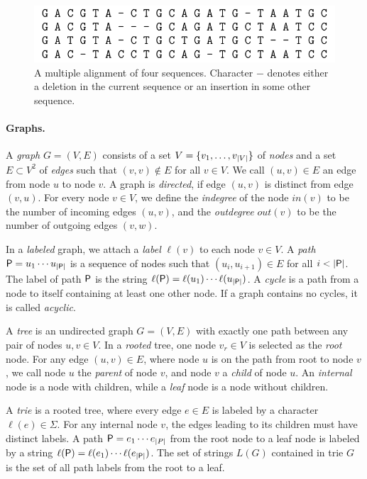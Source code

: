 \begin{figure}
\centerline{\includegraphics{figures/alignment.pdf}}
\caption{A multiple alignment of four sequences. Character $-$ denotes either a deletion in the current sequence or an insertion in some other sequence.}
\label{fig:multiple alignment}
\end{figure}


\paragraph{Graphs.}

A \emph{graph} $G = (V, E)$ consists of a set $V = \{ v_{1}, \dotsc, 
v_{\lvert V \rvert} \}$ of \emph{nodes} and a set $E \subset V^{2}$ of \emph{edges} such that 
$(v, v) \not\in E$ for all $v \in V$. We call $(u, v) \in E$ an edge from node $u$ 
to node $v$. A graph is \emph{directed}, if edge $(u, v)$ is distinct from edge 
$(v, u)$. For every node $v \in V$, 
we define the \emph{indegree} of the node $in(v)$ to be the number of incoming 
edges $(u, v)$, and the \emph{outdegree} $out(v)$ to be the number of outgoing 
edges $(v, w)$.

In a \emph{labeled} graph, we attach a \emph{label} $\ell(v)$ to 
each node $v \in V$. A \emph{path} $\mathsf{P} = u_{1} \dotsm u_{\lvert \mathsf{P} \rvert}$ is a sequence of 
nodes such that $(u_{i}, u_{i+1}) \in E$ for all $i 
< \lvert \mathsf{P} \rvert$. The label of path $\mathsf{P}$ is the string $\ell(\mathsf{P}) = \ell(u_{1}) \dotsm 
\ell(u_{\lvert \mathsf{P} \rvert})$. A \emph{cycle} is a path from a node to itself containing at 
least one other node. If a graph contains no cycles, it is called \emph{acyclic}.

A \emph{tree} is an undirected graph $G = (V, E)$ with exactly one path between any pair of nodes $u, v \in V$. In a \emph{rooted} tree, one node $v_{r} \in V$  is selected as the \emph{root} node. For any edge $(u, v) \in E$, where node $u$ is on the path from root to node $v$, we call node $u$ the \emph{parent} of node $v$, and node $v$ a \emph{child} of node $u$. An \emph{internal} node is a node with children, while a \emph{leaf} node is a node without children.

A \emph{trie} is a rooted tree, where every edge $e \in E$ is labeled by a character $\ell(e) \in \Sigma$. For any internal node $v$, the edges leading to its children must have distinct labels. A path $\mathsf{P} = e_{1} \dotsm e_{\lvert P \rvert}$ from the root node to a leaf node is labeled by a string $\ell(\mathsf{P}) = \ell(e_{1}) \dotsm \ell(e_{\lvert \mathsf{P} \rvert})$. The set of strings $L(G)$ contained in trie $G$ is the set of all path labels from the root to a leaf.

